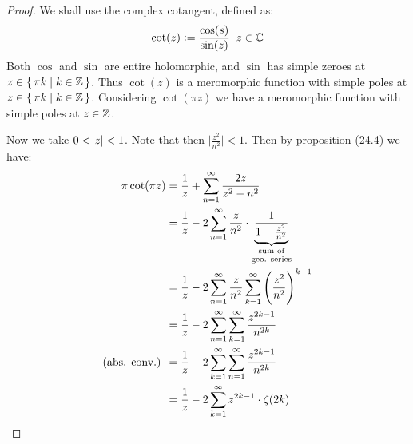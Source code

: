 \begin{proof}
We shall use the complex cotangent, defined as:
\begin{align*}
    \cot(z) \vcentcolon = \frac{\cos(s)}{ \sin(z)} \; \; z \in \mathbb{C}
\end{align*}
Both $\cos$ and $\sin$ are entire holomorphic, and $\sin$ has simple zeroes at $z \in \set{\pi k \mid k \in \mathbb{Z}}$. Thus $\cot (z)$ is a meromorphic function with simple poles at $z \in \set{\pi k \mid k \in \mathbb{Z}}$. Considering $\cot(\pi z)$ we have a meromorphic function with simple poles at $z \in \mathbb{Z}$.

Now we take $0<\abs{z} < 1$. Note that then $\big|\frac{z^2}{n^2} \big| < 1$. Then by proposition (24.4) we have:
\begin{align*}
    \pi \cot(\pi z) &= \frac{1}{z} + \sum_{n=1}^\infty \frac{2 z }{z^2-n^2}\\
    &= \frac{1}{z} - 2 \sum_{n=1}^\infty \frac{z }{n^2} \cdot \underbrace{\frac{1}{1-\frac{z^2}{n^2}}}_{\text{\stackanchor{sum of}{geo. series}}}\\
    &= \frac{1}{z} - 2 \sum_{n=1}^\infty \frac{z }{n^2}  \sum_{k=1}^\infty \br{\frac{z^2}{n^2}}^{k-1}\\
    &= \frac{1}{z} - 2 \sum_{n=1}^\infty \sum_{k=1}^\infty \frac{z^{2k-1}}{n^{2k}}\\
    \text{(abs. conv.) }&= \frac{1}{z} - 2 \sum_{k=1}^\infty \sum_{n=1}^\infty \frac{z^{2k-1}}{n^{2k}}\\
    &= \frac{1}{z} - 2 \sum_{k=1}^\infty z^{2k-1} \cdot \zeta(2k)
\end{align*}


\end{proof}
